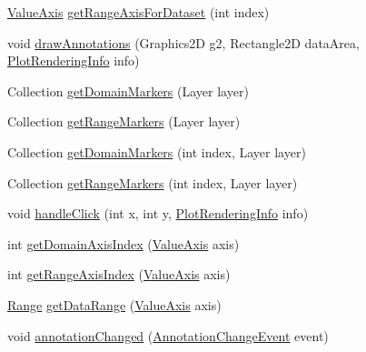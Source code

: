 \begin{DoxyCompactItemize}
\item 
\mbox{\hyperlink{classorg_1_1jfree_1_1chart_1_1axis_1_1_value_axis}{Value\+Axis}} \mbox{\hyperlink{classorg_1_1jfree_1_1chart_1_1plot_1_1_x_y_plot_a2f67fc87db74a7e42d23517402f92b02}{get\+Range\+Axis\+For\+Dataset}} (int index)
\item 
void \mbox{\hyperlink{classorg_1_1jfree_1_1chart_1_1plot_1_1_x_y_plot_af0f9938cf02b866df16815754c4c4e19}{draw\+Annotations}} (Graphics2D g2, Rectangle2D data\+Area, \mbox{\hyperlink{classorg_1_1jfree_1_1chart_1_1plot_1_1_plot_rendering_info}{Plot\+Rendering\+Info}} info)
\item 
Collection \mbox{\hyperlink{classorg_1_1jfree_1_1chart_1_1plot_1_1_x_y_plot_a4c69a8c9c85f28518c9e297e51cc1cb0}{get\+Domain\+Markers}} (Layer layer)
\item 
Collection \mbox{\hyperlink{classorg_1_1jfree_1_1chart_1_1plot_1_1_x_y_plot_a7790ee08681555eedbc7b54c9deddb27}{get\+Range\+Markers}} (Layer layer)
\item 
Collection \mbox{\hyperlink{classorg_1_1jfree_1_1chart_1_1plot_1_1_x_y_plot_a712c78e9b5fc6a88b833b8f39ee58ad7}{get\+Domain\+Markers}} (int index, Layer layer)
\item 
Collection \mbox{\hyperlink{classorg_1_1jfree_1_1chart_1_1plot_1_1_x_y_plot_a04c8f145972330dcf231fea3844a09c4}{get\+Range\+Markers}} (int index, Layer layer)
\item 
void \mbox{\hyperlink{classorg_1_1jfree_1_1chart_1_1plot_1_1_x_y_plot_a8ab341efdd12324ed11a95cbc9e755d7}{handle\+Click}} (int x, int y, \mbox{\hyperlink{classorg_1_1jfree_1_1chart_1_1plot_1_1_plot_rendering_info}{Plot\+Rendering\+Info}} info)
\item 
int \mbox{\hyperlink{classorg_1_1jfree_1_1chart_1_1plot_1_1_x_y_plot_a9ffdbf54f2afe3ebcf1bd03410828f76}{get\+Domain\+Axis\+Index}} (\mbox{\hyperlink{classorg_1_1jfree_1_1chart_1_1axis_1_1_value_axis}{Value\+Axis}} axis)
\item 
int \mbox{\hyperlink{classorg_1_1jfree_1_1chart_1_1plot_1_1_x_y_plot_abbc15bd6c04c452619c6243b3b8ae35c}{get\+Range\+Axis\+Index}} (\mbox{\hyperlink{classorg_1_1jfree_1_1chart_1_1axis_1_1_value_axis}{Value\+Axis}} axis)
\item 
\mbox{\hyperlink{classorg_1_1jfree_1_1data_1_1_range}{Range}} \mbox{\hyperlink{classorg_1_1jfree_1_1chart_1_1plot_1_1_x_y_plot_a69bd0446d06cc7002be74bba4ed12520}{get\+Data\+Range}} (\mbox{\hyperlink{classorg_1_1jfree_1_1chart_1_1axis_1_1_value_axis}{Value\+Axis}} axis)
\item 
void \mbox{\hyperlink{classorg_1_1jfree_1_1chart_1_1plot_1_1_x_y_plot_af6da460c8f11019c9beea14f46d08148}{annotation\+Changed}} (\mbox{\hyperlink{classorg_1_1jfree_1_1chart_1_1event_1_1_annotation_change_event}{Annotation\+Change\+Event}} event)

\end{DoxyCompactItemize}
